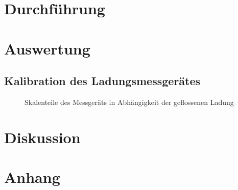 \documentclass[12pt,a4paper,titlepage,headinclude,bibtotoc]{scrartcl}
\begin{document}
\section{Durchführung}
\label{sec:durchfuehrung}

\section{Auswertung}
\label{sec:auswertung}
\subsection{Kalibration des Ladungsmessgerätes}
\begin{figure}
 \centering
 
 \caption{Skalenteile des Messgeräts in Abhängigkeit der geflossenen Ladung}
 \label{fig:Kalibration}
\end{figure}



\section{Diskussion}
\label{sec:diskussion}

\section{Anhang}
\end{document}
